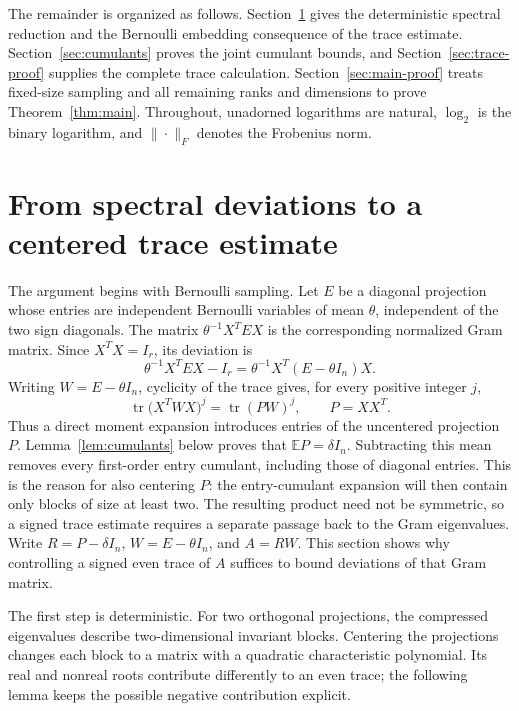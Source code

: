 \documentclass[11pt]{article}
\theoremstyle{definition}
\theoremstyle{remark}
\theoremstyle{plain}
\newcommand{\E}{\mathbb E}
\DeclareMathOperator{\tr}{tr}
\begin{document}
The remainder is organized as follows.  Section~\ref{sec:reduction} gives the deterministic spectral reduction
and the Bernoulli embedding consequence of the trace estimate.
Section~\ref{sec:cumulants} proves the joint cumulant bounds, and
Section~\ref{sec:trace-proof} supplies the complete trace calculation.
Section~\ref{sec:main-proof} treats fixed-size sampling and all
remaining ranks and dimensions to prove Theorem~\ref{thm:main}.
Throughout, unadorned logarithms are natural, $\log_2$ is the binary
logarithm, and $\|\cdot\|_F$ denotes the Frobenius norm.

\section{From spectral deviations to a centered trace estimate}
\label{sec:reduction}

The argument begins with Bernoulli sampling. Let $E$ be a diagonal projection
whose entries are independent Bernoulli variables of mean $\theta$,
independent of the two sign diagonals. The matrix
$\theta^{-1}X^TEX$ is the corresponding normalized Gram matrix.
Since $X^TX=I_r$, its deviation is
\begin{equation}\label{eq:gram-centering}
 \theta^{-1}X^TEX-I_r
       =\theta^{-1}X^T(E-\theta I_n)X.
\end{equation}
Writing $W=E-\theta I_n$, cyclicity of the trace gives, for every
positive integer $j$,
\[
 \tr\bigl(X^TWX\bigr)^j=\tr(PW)^j,\qquad P=XX^T.
\]
Thus a direct moment expansion introduces entries of the
uncentered projection $P$. Lemma~\ref{lem:cumulants} below proves
that $\E P=\delta I_n$.
Subtracting this mean removes every first-order entry cumulant,
including those of diagonal entries. This is the reason for also
centering $P$: the entry-cumulant expansion will then contain only
blocks of size at least two. The resulting product need not be
symmetric, so a signed trace estimate requires a separate passage
back to the Gram eigenvalues.
Write $R=P-\delta I_n$, $W=E-\theta I_n$, and $A=RW$.
This section shows why controlling a signed even trace of $A$
suffices to bound deviations of that Gram matrix.

The first step is deterministic. For two orthogonal projections,
the compressed eigenvalues describe two-dimensional invariant
blocks. Centering the projections changes each block to a matrix
with a quadratic characteristic polynomial. Its real and nonreal
roots contribute differently to an even trace; the following lemma
keeps the possible negative contribution explicit.
\end{document}
